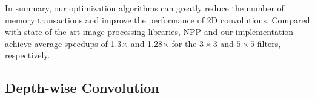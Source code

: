 In summary, our optimization algorithms can greatly reduce the number of memory transactions and improve the performance of 2D
convolutions. Compared with state-of-the-art image processing libraries, NPP and our implementation achieve average speedups of 1.3$\times$ and 1.28$\times$ for the $3 \times 3$ and $5 \times 5$ filters, respectively.

\subsection{Depth-wise Convolution}
\label{3dconvexp}

